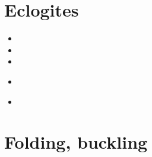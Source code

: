 \section{Eclogites} 

\begin{small}
\begin{itemize}
\item[\twothousandone] 
\item[\twothousandseven] 
\item[\twothousandnine] 
\item[\twothousandthirteen] 
 \\
\item[\twothousandtwentytwo] 
\\ 
\end{itemize}
\end{small}


\section{Folding, buckling} 

